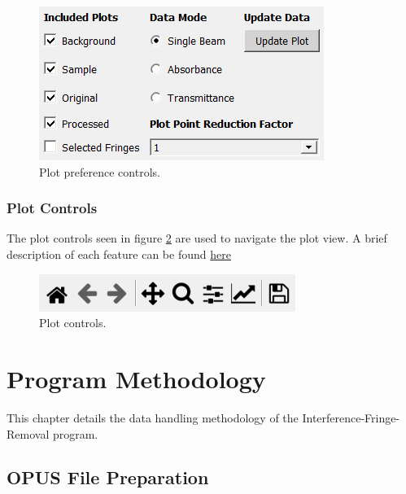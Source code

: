 \documentclass[a4paper, 12pt]{report}
\begin{document}
    \begin{figure}[h]
        \centering
        \includegraphics{figures/plot_preferences.png}
        \caption{Plot preference controls.}
        \label{fig:5}
    \end{figure}
    
    \subsection{Plot Controls}
    
    The plot controls seen in figure \ref{fig:6} are used to navigate the plot view. A brief description of each feature can be found \href{https://matplotlib.org/3.2.2/users/navigation_toolbar.html}{here}
    
    \begin{figure}[h]
        \centering
        \includegraphics{figures/plot_controls.png}
        \caption{Plot controls.}
        \label{fig:6}
    \end{figure}
    
    
    
    
    \chapter{Program Methodology}
    
    This chapter details the data handling methodology of the Interference-Fringe-Removal program.
    
    \section{OPUS File Preparation}
    
\end{document}
